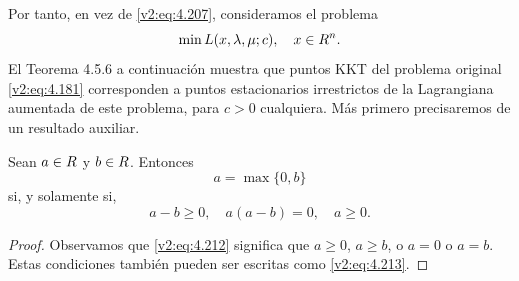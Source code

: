 Por tanto, en vez de \eqref{v2:eq:4.207}, consideramos el problema
\begin{equation}
    \min L(x, \lambda, \mu; c), \quad x \in R^n.
    \label{v2:eq:4.211}
\end{equation}
El Teorema 4.5.6 a continuación muestra que puntos KKT del problema original \eqref{v2:eq:4.181} corresponden a puntos estacionarios irrestrictos de la Lagrangiana aumentada de este problema, para $c > 0$ cualquiera. Más primero precisaremos de un resultado auxiliar.

\begin{lemma}\label{v2:lem:4.5.5}
    Sean $a \in R$ y $b \in R$. Entonces
    \begin{equation}
        a = \max\{0, b\}
        \label{v2:eq:4.212}
    \end{equation}
    si, y solamente si,
    \begin{equation}
        a - b \ge 0, \quad a(a - b) = 0, \quad a \ge 0.
        \label{v2:eq:4.213}
    \end{equation}
\end{lemma}
\begin{proof}
    Observamos que \eqref{v2:eq:4.212} significa que $a \ge 0$, $a \ge b$, o $a = 0$ o $a = b$. Estas condiciones también pueden ser escritas como \eqref{v2:eq:4.213}.
\end{proof}


